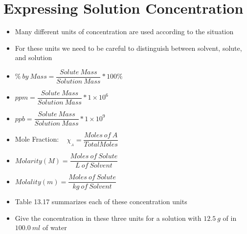 \documentclass[12pt, openany, letterpaper]{memoir}
\begin{document}
\section{Expressing Solution Concentration}
\begin{itemize}
  \item Many different units of concentration are used according to the situation
	\item For these units we need to be careful to distinguish between solvent, solute, and solution
	\item $\%~by~Mass = \dfrac{Solute~Mass}{Solution~Mass}*100\%$
	\item $ppm = \dfrac{Solute~Mass}{Solution~Mass}*1\times10^6$
	\item $ppb = \dfrac{Solute~Mass}{Solution~Mass}*1\times10^9$
	\item Mole Fraction: ~  $\chi_{_A}=\dfrac{Moles~of~A}{Total Moles}$
	\item $Molarity (M) = \dfrac{Moles~of~Solute}{L~of~Solvent}$
	\item $Molality (m) = \dfrac{Moles~of~Solute}{kg~of~Solvent}$
	\item Table 13.17 summarizes each of these concentration units
	\item Give the concentration in these three units for a solution with $12.5~g$ of  in $100.0~ml$ of water
\end{itemize}
\end{document}
